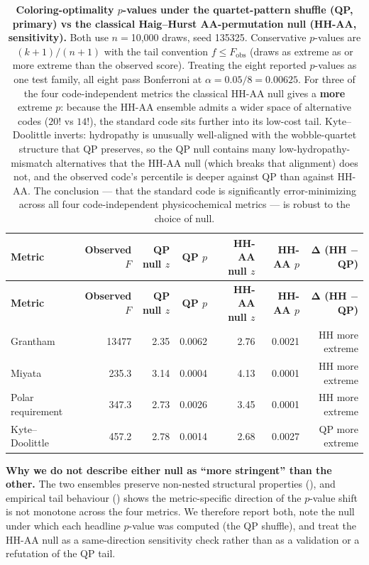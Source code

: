 \documentclass[preprint,11pt,authoryear,a4paper]{elsarticle}
\begin{document}
\begin{longtable}[]{@{}lrrrrrr@{}}
\caption{\textbf{Coloring-optimality \(p\)-values under the
quartet-pattern shuffle (QP, primary) vs the classical Haig--Hurst
AA-permutation null (HH-AA, sensitivity).} Both use \(n =\)10,000 draws,
seed 135325. Conservative \(p\)-values are \((k + 1)/(n + 1)\) with the
tail convention \(f \leq F_{\text{obs}}\) (draws as extreme as or more
extreme than the observed score). Treating the eight reported
\(p\)-values as one test family, all eight pass Bonferroni at
\(\alpha = 0.05/8 = 0.00625\). For three of the four code-independent
metrics the classical HH-AA null gives a \textbf{more} extreme \(p\):
because the HH-AA ensemble admits a wider space of alternative codes
(\(20!\) vs \(14!\)), the standard code sits further into its low-cost
tail. Kyte--Doolittle inverts: hydropathy is unusually well-aligned with
the wobble-quartet structure that QP preserves, so the QP null contains
many low-hydropathy-mismatch alternatives that the HH-AA null (which
breaks that alignment) does not, and the observed code's percentile is
deeper against QP than against HH-AA. The conclusion --- that the
standard code is significantly error-minimizing across all four
code-independent physicochemical metrics --- is robust to the choice of
null.}\tabularnewline
\toprule\noalign{}
\textbf{Metric} & \textbf{Observed \(F\)} & \textbf{QP null \(z\)} &
\textbf{QP \(p\)} & \textbf{HH-AA null \(z\)} & \textbf{HH-AA \(p\)} &
\textbf{Δ (HH \ensuremath{-} QP)} \\
\midrule\noalign{}
\endfirsthead
\toprule\noalign{}
\textbf{Metric} & \textbf{Observed \(F\)} & \textbf{QP null \(z\)} &
\textbf{QP \(p\)} & \textbf{HH-AA null \(z\)} & \textbf{HH-AA \(p\)} &
\textbf{Δ (HH \ensuremath{-} QP)} \\
\midrule\noalign{}
\endhead
\bottomrule\noalign{}
\endlastfoot
Grantham & 13477 & 2.35 & 0.0062 & 2.76 & 0.0021 & HH more extreme \\
Miyata & 235.3 & 3.14 & 0.0004 & 4.13 & 0.0001 & HH more extreme \\
Polar requirement & 347.3 & 2.73 & 0.0026 & 3.45 & 0.0001 & HH more
extreme \\
Kyte--Doolittle & 457.2 & 2.78 & 0.0014 & 2.68 & 0.0027 & QP more
extreme \\
\end{longtable}

\protect{}\label{tbl:s-null-comparison}{}

\textbf{Why we do not describe either null as ``more stringent'' than
the other.} The two ensembles preserve non-nested structural properties
(), and empirical tail behaviour
() shows the metric-specific direction of
the \(p\)-value shift is not monotone across the four metrics. We
therefore report both, note the null under which each headline
\(p\)-value was computed (the QP shuffle), and treat the HH-AA null as a
same-direction sensitivity check rather than as a validation or a
refutation of the QP tail.
\end{document}
